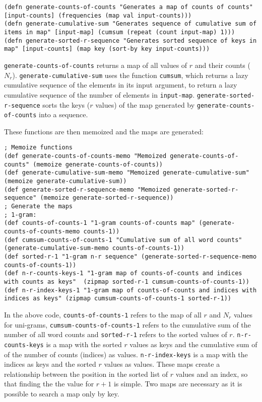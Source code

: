 \begin{lstlisting}
(defn generate-counts-of-counts "Generates a map of counts of counts" [input-counts] (frequencies (map val input-counts))) 
(defn generate-cumulative-sum "Generates sequence of cumulative sum of items in map" [input-map] (cumsum (repeat (count input-map) 1))) 
(defn generate-sorted-r-sequence "Generates sorted sequence of keys in map" [input-counts] (map key (sort-by key input-counts)))
\end{lstlisting}

\lstinline!generate-counts-of-counts! returns a map of all values of $r$ and their counts ($N_{r}$). \lstinline!generate-cumulative-sum! uses the function \lstinline!cumsum!, which returns a lazy cumulative sequence of the elements in its input argument, to return a lazy cumulative sequence of the number of elements in \lstinline!input-map!. \lstinline!generate-sorted-r-sequence! sorts the keys ($r$ values) of the map generated by \lstinline!generate-counts-of-counts! into a sequence.

These functions are then memoized and the maps are generated:

\begin{lstlisting}
; Memoize functions
(def generate-counts-of-counts-memo "Memoized generate-counts-of-counts" (memoize generate-counts-of-counts))
(def generate-cumulative-sum-memo "Memoized generate-cumulative-sum" (memoize generate-cumulative-sum))
(def generate-sorted-r-sequence-memo "Memoized generate-sorted-r-sequence" (memoize generate-sorted-r-sequence))
; Generate the maps
; 1-gram:
(def counts-of-counts-1 "1-gram counts-of-counts map" (generate-counts-of-counts-memo counts-1))
(def cumsum-counts-of-counts-1 "Cumulative sum of all word counts" (generate-cumulative-sum-memo counts-of-counts-1))
(def sorted-r-1 "1-gram n-r sequence" (generate-sorted-r-sequence-memo counts-of-counts-1))
(def n-r-counts-keys-1 "1-gram map of counts-of-counts and indices with counts as keys"  (zipmap sorted-r-1 cumsum-counts-of-counts-1))
(def n-r-index-keys-1 "1-gram map of counts-of-counts and indices with indices as keys" (zipmap cumsum-counts-of-counts-1 sorted-r-1))
\end{lstlisting}

In the above code, \lstinline!counts-of-counts-1! refers to the map of all $r$ and $N_{r}$ values for uni-grams, \lstinline!cumsum-counts-of-counts-1! refers to the cumulative sum of the number of all word counts and \lstinline!sorted-r-1! refers to the sorted values of $r$. \lstinline!n-r-counts-keys! is a map with the sorted $r$ values as keys and the cumulative sum of of the number of counts (indices) as values. \lstinline!n-r-index-keys! is a map with the indices as keys and the sorted $r$ values as values. These maps create a relationship between the position in the sorted list of $r$ values and an index, so that finding the the value for $r+1$ is simple. Two maps are necessary as it is possible to search a map only by key.

